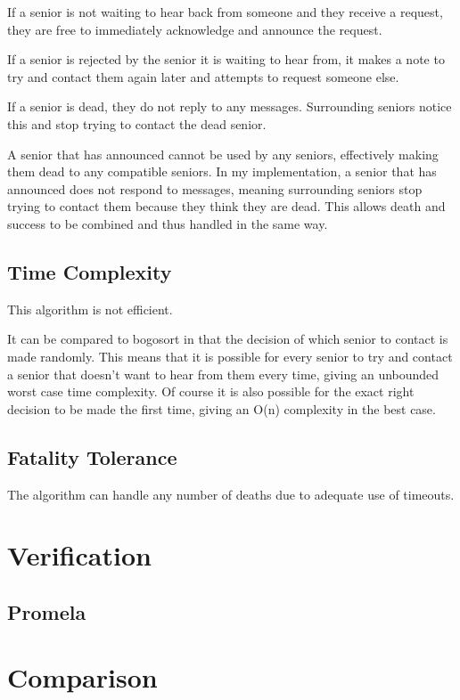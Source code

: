 \documentclass[a4paper]{article}
\begin{document}
If a senior is not waiting to hear back from someone and they receive a request, they are free to immediately acknowledge and announce the request. 

If a senior is rejected by the senior it is waiting to hear from, it makes a note to try and contact them again later and attempts to request someone else. 

If a senior is dead, they do not reply to any messages. Surrounding seniors notice this and stop trying to contact the dead senior. 

A senior that has announced cannot be used by any seniors, effectively making them dead to any compatible seniors. In my implementation, a senior that has announced does not respond to messages, meaning surrounding seniors stop trying to contact them because they think they are dead. This allows death and success to be combined and thus handled in the same way. 

\subsection{Time Complexity}
This algorithm is not efficient.

It can be compared to bogosort in that the decision of which senior to contact is made randomly. This means that it is possible for every senior to try and contact a senior that doesn't want to hear from them every time, giving an unbounded worst case time complexity. Of course it is also possible for the exact right decision to be made the first time, giving an O(n) complexity in the best case. 

\subsection{Fatality Tolerance}
The algorithm can handle any number of deaths due to adequate use of timeouts. 

\section{Verification}
\subsection{Promela}

\section{Comparison}
\end{document}
